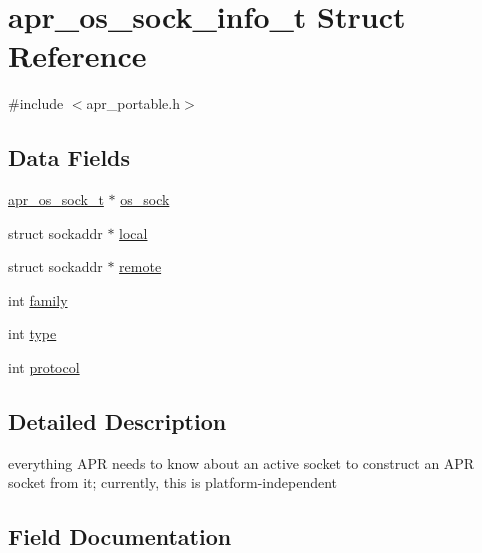 \hypertarget{structapr__os__sock__info__t}{}\section{apr\+\_\+os\+\_\+sock\+\_\+info\+\_\+t Struct Reference}
\label{structapr__os__sock__info__t}


{\ttfamily \#include $<$apr\+\_\+portable.\+h$>$}

\subsection*{Data Fields}
\begin{DoxyCompactItemize}
\item 
\hyperlink{group__apr__portabile_ga2965cd2e48cb6513bc0ba05aa6083ed7}{apr\+\_\+os\+\_\+sock\+\_\+t} $\ast$ \hyperlink{structapr__os__sock__info__t_a952464d2f91ca4650e8b4848a81745b5}{os\+\_\+sock}
\item 
struct sockaddr $\ast$ \hyperlink{structapr__os__sock__info__t_afaf470560cbc3088479af708878aa086}{local}
\item 
struct sockaddr $\ast$ \hyperlink{structapr__os__sock__info__t_ae71fe14a5eb9141fc4ad0a6d0a91f17e}{remote}
\item 
int \hyperlink{structapr__os__sock__info__t_aa29fd0cf57b0b5e3559961f068fa8b7e}{family}
\item 
int \hyperlink{structapr__os__sock__info__t_a248fb394cd644b31619f44de0936aa04}{type}
\item 
int \hyperlink{structapr__os__sock__info__t_a176ede3ecf40abf0f82a01bfeb95f1e3}{protocol}
\end{DoxyCompactItemize}


\subsection{Detailed Description}
everything A\+PR needs to know about an active socket to construct an A\+PR socket from it; currently, this is platform-\/independent 

\subsection{Field Documentation}
